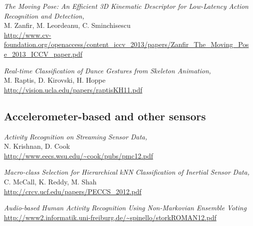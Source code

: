 \documentclass[letterpaper,12pt,fullpage]{article}
\begin{document}
{\it The Moving Pose: An Efficient 3D Kinematic Descriptor for Low-Latency
Action Recognition and Detection,}\\
M. Zanfir, M. Leordeanu, C. Sminchisescu\\
\url{http://www.cv-foundation.org/openaccess/content_iccv_2013/papers/Zanfir_The_Moving_Pose_2013_ICCV_paper.pdf}

{\it Real-time Classification of Dance Gestures from Skeleton Animation,}\\
M. Raptis, D. Kirovski, H. Hoppe\\
\url{http://vision.ucla.edu/papers/raptisKH11.pdf}

\subsection{Accelerometer-based and other sensors}

{\it Activity Recognition on Streaming Sensor Data,}\\
N. Krishnan, D. Cook\\
\url{http://www.eecs.wsu.edu/~cook/pubs/pmc12.pdf}

{\it Macro-class Selection for Hierarchical kNN Classification of Inertial
Sensor Data,}\\
C. McCall, K. Reddy, M. Shah\\
\url{http://crcv.ucf.edu/papers/PECCS_2012.pdf}

{\it Audio-based Human Activity Recognition Using Non-Markovian Ensemble
Voting}\\
\url{http://www2.informatik.uni-freiburg.de/~spinello/storkROMAN12.pdf}

%
%
\end{document}
